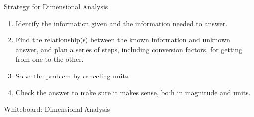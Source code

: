\documentclass[11pt]{beamer}
\begin{document}
\begin{frame}{Strategy for Dimensional Analysis}
  \begin{enumerate}
  \item Identify the information given and the
    information needed to answer.
  \item Find the relationship(s) between the known
    information and unknown answer, and plan a series
    of steps, including conversion factors, for getting from
    one to the other.
  \item Solve the problem by canceling units.
  \item Check the answer to make sure it makes sense,
    both in magnitude and units.
  \end{enumerate}
\end{frame}

\begin{frame}{Whiteboard: Dimensional Analysis}
\end{frame}
\end{document}
